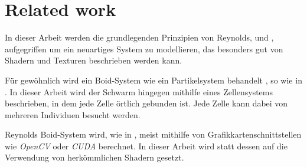 \documentclass[a4paper, 10pt, journal]{wissarbIEEE}      %
\begin{document}



\section{Related work}


In dieser Arbeit werden die grundlegenden Prinzipien von Reynolds, \cite{Reynolds87flocks} und \cite{Reynolds99steeringbehaviors}, aufgegriffen um ein neuartiges System zu modellieren, das besonders gut von Shadern und Texturen beschrieben werden kann.

Für gewöhnlich wird ein Boid-System wie ein Partikelsystem  behandelt \cite{Reynolds87flocks}, so wie in \cite{Oliver14Tschesche}. 
In dieser Arbeit wird der Schwarm hingegen mithilfe eines Zellensystems beschrieben, in dem jede Zelle örtlich gebunden ist. Jede Zelle kann dabei von mehreren Individuen besucht werden. 


Reynolds Boid-System wird, wie in \cite{Oliver14Tschesche}, meist mithilfe von Grafikkartenschnittstellen wie \textit{OpenCV} oder \textit{CUDA} berechnet. In dieser Arbeit wird statt dessen auf die Verwendung von herkömmlichen Shadern gesetzt.
\end{document}
